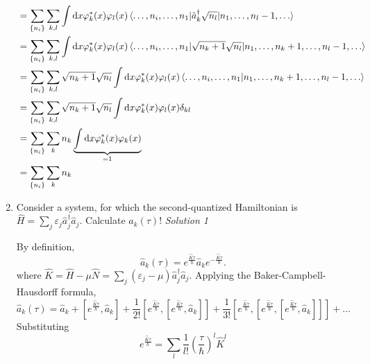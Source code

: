\documentclass[11pt, a4paper]{article}
\newcommand{\dd}{\mathrm{d}}
\begin{document}
\begin{enumerate}
\begin{align*}
        & = \sum\limits_{\{n_i\}}\sum\limits_{k,l}\int\dd x \varphi^*_k(x)\varphi_l(x) \braket{\dots,n_i,\dots,n_1 | \hat a_k^{\dagger}
        \sqrt{n_l} |n_1, \dots, n_l-1, \dots} \\
        & = \sum\limits_{\{n_i\}}\sum\limits_{k,l}\int\dd x \varphi^*_k(x)\varphi_l(x) \braket{\dots,n_i,\dots,n_1 | 
        \sqrt{n_k+1}\sqrt{n_l} |n_1, \dots, n_k+1, \dots, n_l-1, \dots} \\
        & = \sum\limits_{\{n_i\}}\sum\limits_{k,l} \sqrt{n_k+1}\sqrt{n_l} \int\dd x \varphi^*_k(x)\varphi_l(x) \braket{\dots,n_i,\dots,n_1 |n_1, \dots, n_k+1, \dots, n_l-1, \dots} \\
        & = \sum\limits_{\{n_i\}}\sum\limits_{k,l} \sqrt{n_k+1}\sqrt{n_l} \int\dd x \varphi^*_k(x)\varphi_l(x) \delta_{kl} \\
        & = \sum\limits_{\{n_i\}}\sum\limits_{k} n_k \underbrace{\int\dd x \varphi^*_k(x)\varphi_k(x)}_{=1}\\
        & = \sum\limits_{\{n_i\}}\sum\limits_{k} n_k
    \end{align*}
    \item Consider a system, for which the second-quantized Hamiltonian is $\displaystyle{\hat H = \sum\limits_j \varepsilon_j \hat a_j^{\dagger}\hat a_j}$.
    Calculate $\hat a_k(\tau)$!
    \subitem \textit{Solution 1}
    \par By definition,
    \begin{equation*}
        \hat a_k(\tau) = e^{\frac{\hat K\tau}{\hbar}}\hat a_k e^{-\frac{\hat K\tau}{\hbar}}.
    \end{equation*}
    where $\displaystyle{\hat K = \hat H - \mu\hat N = \sum\limits_j(\varepsilon_j-\mu)\hat a_j^{\dagger}\hat a_j}$.
    Applying the Baker-Campbell-Hausdorff formula, 
    \begin{equation*}
        \hat a_k(\tau) = \hat a_k + \left[e^{\frac{\hat K\tau}{\hbar}},\hat a_k\right]
        + \frac{1}{2!} \left[ e^{\frac{\hat K\tau}{\hbar}}, \left[e^{\frac{\hat K\tau}{\hbar}},\hat a_k\right]\right] +
        \frac{1}{3!} \left[ e^{\frac{\hat K\tau}{\hbar}}, \left[ e^{\frac{\hat K\tau}{\hbar}}, \left[e^{\frac{\hat K\tau}{\hbar}},\hat a_k\right]\right] \right] + \dots
    \end{equation*}
    Substituting 
    \begin{equation*}
        e^{\frac{\hat K\tau}{\hbar}} = \sum\limits_l \frac{1}{l!}\left(\frac{\tau}{\hbar}\right)^l\hat K^l
    \end{equation*}
    \begin{align*}

\end{align*}
\end{enumerate}
\end{document}
